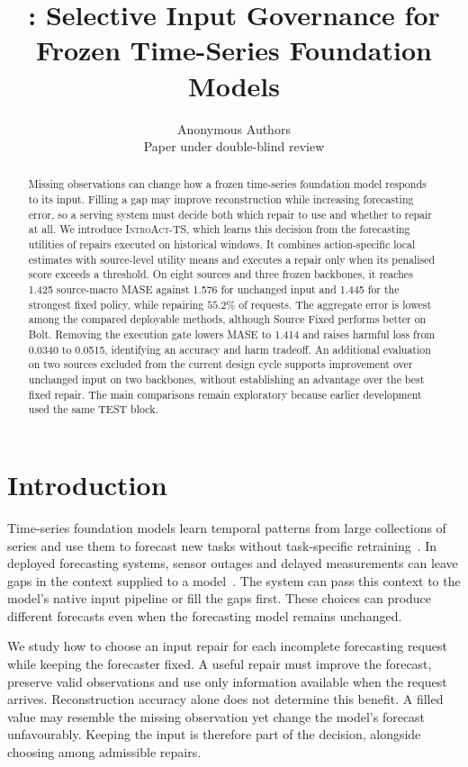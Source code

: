 \documentclass{article}
\title{\introact{}: Selective Input Governance for \\
Frozen Time-Series Foundation Models}
\author{Anonymous Authors\\Paper under double-blind review}
\newcommand{\introact}{\textsc{IntroAct-TS}}
\begin{document}
\maketitle

\begin{abstract}
Missing observations can change how a frozen time-series foundation model responds to its
input. Filling a gap may improve reconstruction while increasing forecasting error, so a
serving system must decide both which repair to use and whether to repair at all.
We introduce \introact{}, which learns this decision from the forecasting utilities of
repairs executed on historical windows. It combines action-specific local estimates with
source-level utility means and executes a repair only when its penalised score exceeds a
threshold. On eight sources and three frozen backbones, it reaches 1.425 source-macro MASE
against 1.576 for unchanged input and 1.445 for the strongest fixed policy, while repairing
$55.2\%$ of requests. The aggregate error is lowest among the compared deployable methods,
although Source Fixed performs better on Bolt. Removing the execution gate lowers MASE to
1.414 and raises harmful loss from 0.0340 to 0.0515, identifying an accuracy and harm tradeoff.
An additional evaluation on two sources excluded from the current design cycle supports
improvement over unchanged input on two backbones, without establishing an advantage over
the best fixed repair. The main comparisons remain exploratory because earlier development
used the same TEST block.
\end{abstract}

\section{Introduction}
\label{sec:intro}
Time-series foundation models learn temporal patterns from large collections of series and
use them to forecast new tasks without task-specific
retraining~\citep{ansari2024chronos,chronosbolt2025,das2024timesfm,woo2024moirai,chronos2_2025}.
In deployed forecasting systems, sensor outages and delayed measurements can leave gaps in
the context supplied to a model~\citep{chen2024bitgraph,peng2025s4m}. The system can pass
this context to the model's native input pipeline or fill the gaps first. These choices
can produce different forecasts even when the forecasting model remains unchanged.

We study how to choose an input repair for each incomplete forecasting request while keeping
the forecaster fixed. A useful repair must improve the forecast, preserve valid observations
and use only information available when the request arrives. Reconstruction accuracy alone
does not determine this benefit. A filled value may resemble the missing observation yet
change the model's forecast unfavourably. Keeping the input is therefore part of the decision,
alongside choosing among admissible repairs.
\end{document}
